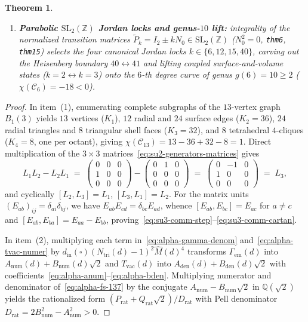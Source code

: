 \documentclass[11pt,a4paper]{article}
\theoremstyle{plain}
\newtheorem{theorem}{Theorem}[section]
\theoremstyle{definition}
\begin{document}
\begin{theorem}
\begin{enumerate}[label=\textbf{(\arabic*)},leftmargin=*]
\item \textbf{Parabolic $\mathrm{SL}_2(\mathbb{Z})$ Jordan locks and genus-$10$ lift:}
  integrality of the normalized transition matrices $\widetilde{P}_k = I_2 \pm k N_0 \in \mathrm{SL}_2(\mathbb{Z})$ ($N_0^2 = 0$, \texttt{thm6}, \texttt{thm15}) selects the four canonical Jordan locks $k \in \{6, 12, 15, 40\}$, carving out the Heisenberg boundary $40 \leftrightarrow 41$ and lifting coupled surface-and-volume states ($k = 2 \leftrightarrow k = 3$) onto the $6$-th degree curve of genus $g(6) = 10 \ge 2$ ($\chi(\mathcal{C}_6) = -18 < 0$).
\end{enumerate}
\end{theorem}

\begin{proof}
In item~(1), enumerating complete subgraphs of the $13$-vertex graph $B_1(3)$ yields $13$ vertices ($K_1$), $12$ radial and $24$ surface edges ($K_2 = 36$), $24$ radial triangles and $8$ triangular shell faces ($K_3 = 32$), and $8$ tetrahedral $4$-cliques ($K_4 = 8$, one per octant), giving $\chi(\mathcal{C}_{13}) = 13 - 36 + 32 - 8 = 1$. Direct multiplication of the $3\times 3$ matrices~\eqref{eq:su2-generators-matrices} gives
\begin{equation*}
  L_1 L_2 - L_2 L_1 \;=\; \begin{pmatrix} 0 & 0 & 0 \\ 1 & 0 & 0 \\ 0 & 0 & 0 \end{pmatrix} - \begin{pmatrix} 0 & 1 & 0 \\ 0 & 0 & 0 \\ 0 & 0 & 0 \end{pmatrix} \;=\; \begin{pmatrix} 0 & -1 & 0 \\ 1 & 0 & 0 \\ 0 & 0 & 0 \end{pmatrix} \;=\; L_3,
\end{equation*}
and cyclically $[L_2, L_3] = L_1$, $[L_3, L_1] = L_2$. For the matrix units $(E_{ab})_{ij} = \delta_{ai}\delta_{bj}$, we have $E_{ab} E_{cd} = \delta_{bc} E_{ad}$, whence $[E_{ab}, E_{bc}] = E_{ac}$ for $a \ne c$ and $[E_{ab}, E_{ba}] = E_{aa} - E_{bb}$, proving~\eqref{eq:su3-comm-step}--\eqref{eq:su3-comm-cartan}.

In item~(2), multiplying each term in~\eqref{eq:alpha-gamma-denom} and~\eqref{eq:alpha-tvac-numer} by $d_{\mathrm{in}}(\square)(N_{\mathrm{tri}}(d)-1)^2\widehat{M}(d)^4$ transforms $\Gamma_{\mathrm{em}}(d)$ into $A_{\mathrm{num}}(d) + B_{\mathrm{num}}(d)\sqrt{2}$ and $T_{\mathrm{vac}}(d)$ into $A_{\mathrm{den}}(d) + B_{\mathrm{den}}(d)\sqrt{2}$ with coefficients~\eqref{eq:alpha-anum}--\eqref{eq:alpha-bden}. Multiplying numerator and denominator of~\eqref{eq:alpha-fs-137} by the conjugate $A_{\mathrm{num}} - B_{\mathrm{num}}\sqrt{2}$ in $\mathbb{Q}(\sqrt{2})$ yields the rationalized form $(P_{\mathrm{rat}} + Q_{\mathrm{rat}}\sqrt{2})/D_{\mathrm{rat}}$ with Pell denominator $D_{\mathrm{rat}} = 2 B_{\mathrm{num}}^2 - A_{\mathrm{num}}^2 > 0$.
\end{proof}
\end{document}
